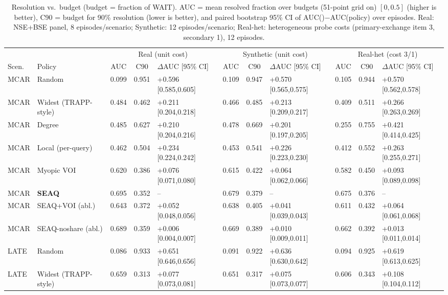 \begin{table}[t]\centering
\caption{Resolution vs.\ budget (budget = fraction of WAIT). AUC = mean resolved fraction over budgets (51-point grid on) $[0,0.5]$ (higher is better), C90 = budget for 90\% resolution (lower is better), and paired bootstrap 95\% CI of AUC(\seaq)$-$AUC(policy) over episodes. Real: NSE+BSE panel, 8 episodes/scenario; Synthetic: 12 episodes/scenario; Real-het: heterogeneous probe costs (primary-exchange item 3, secondary 1), 12 episodes.}\label{tab:acq}
\scriptsize\setlength{\tabcolsep}{3pt}
\begin{tabular}{llccl|ccl|ccl}\toprule
 & & \multicolumn{3}{c|}{Real (unit cost)} & \multicolumn{3}{c|}{Synthetic (unit cost)} & \multicolumn{3}{c}{Real-het (cost 3/1)}\\
Scen. & Policy & AUC & C90 & $\Delta$AUC [95\% CI] & AUC & C90 & $\Delta$AUC [95\% CI] & AUC & C90 & $\Delta$AUC [95\% CI]\\
\midrule
MCAR & Random & 0.099 & 0.951 & +0.596 [0.585,0.605] & 0.109 & 0.947 & +0.570 [0.565,0.575] & 0.105 & 0.944 & +0.570 [0.562,0.578] \\
MCAR & Widest (TRAPP-style) & 0.484 & 0.462 & +0.211 [0.204,0.218] & 0.466 & 0.485 & +0.213 [0.209,0.217] & 0.409 & 0.511 & +0.266 [0.263,0.269] \\
MCAR & Degree & 0.485 & 0.627 & +0.210 [0.204,0.216] & 0.478 & 0.669 & +0.201 [0.197,0.205] & 0.255 & 0.755 & +0.421 [0.414,0.425] \\
MCAR & Local (per-query) & 0.462 & 0.504 & +0.234 [0.224,0.242] & 0.453 & 0.541 & +0.226 [0.223,0.230] & 0.412 & 0.552 & +0.263 [0.255,0.271] \\
MCAR & Myopic VOI & 0.620 & 0.386 & +0.076 [0.071,0.080] & 0.615 & 0.422 & +0.064 [0.062,0.066] & 0.582 & 0.450 & +0.093 [0.089,0.098] \\
MCAR & \textbf{SEAQ} & 0.695 & 0.352 & -- & 0.679 & 0.379 & -- & 0.675 & 0.376 & -- \\
MCAR & SEAQ+VOI (abl.) & 0.643 & 0.372 & +0.052 [0.048,0.056] & 0.638 & 0.405 & +0.041 [0.039,0.043] & 0.611 & 0.432 & +0.064 [0.061,0.068] \\
MCAR & SEAQ-noshare (abl.) & 0.689 & 0.359 & +0.006 [0.004,0.007] & 0.669 & 0.389 & +0.010 [0.009,0.011] & 0.662 & 0.392 & +0.013 [0.011,0.014] \\
\midrule
LATE & Random & 0.086 & 0.933 & +0.651 [0.646,0.656] & 0.091 & 0.922 & +0.636 [0.630,0.642] & 0.094 & 0.925 & +0.619 [0.613,0.625] \\
LATE & Widest (TRAPP-style) & 0.659 & 0.313 & +0.077 [0.073,0.081] & 0.651 & 0.317 & +0.075 [0.073,0.077] & 0.606 & 0.343 & +0.108 [0.104,0.112] \\

\end{tabular}
\end{table}
